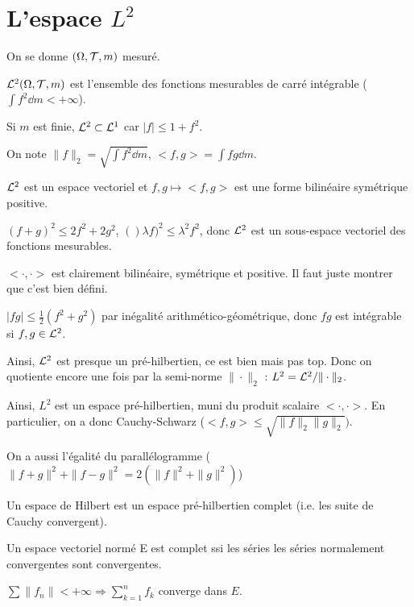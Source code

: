 \documentclass[10pt,a4paper,notitlepage ]{report}
\begin{document}
\section{L'espace $L^2$}

On se donne $(\Omega,\mathcal T, m)$ mesuré.

\begin{definition}
	$\mathcal L^2(\Omega,\mathcal T,m)$ est l'ensemble des fonctions mesurables de carré intégrable ($\int f^2 \dd m < +\infty$).
\end{definition}

\begin{rem}
	Si $m$ est finie, $\mathcal L^2 \subset \mathcal L^1$ car $|f|\le 1+f^2$.
\end{rem}

On note $\|f\|_2 = \sqrt{\int f^2 \dd m}$, $<f,g> = \int fg \dd m$.

\begin{lemme}
	$\mathcal L^2$ est un espace vectoriel et $f,g\mapsto <f,g>$ est une forme bilinéaire symétrique positive.
\end{lemme}
\begin{demo}
	$(f+g)^2 \le 2f^2 + 2g^2$, $()\lambda f)^2 \le \lambda^2 f^2$, donc $\mathcal L^2$ est un sous-espace vectoriel des fonctions mesurables.
	
	$<\cdot, \cdot>$ est clairement bilinéaire, symétrique et positive. Il faut juste montrer que c'est bien défini.
	
	$|fg| \le \frac 1 2 (f^2 + g^2)$ par inégalité arithmético-géométrique, donc $fg$ est intégrable si $f,g\in\mathcal L^2$.
\end{demo}
Ainsi, $\mathcal L^2$ est presque un pré-hilbertien, ce est bien mais pas top. Donc on quotiente encore une fois par la semi-norme $\|\cdot\|_2$ : $L^2 = \mathcal L^2/\|\cdot\|_2$.

Ainsi, $L^2$ est un espace pré-hilbertien, muni du produit scalaire $<\cdot,\cdot>$. En particulier, on a donc Cauchy-Schwarz ($<f,g> \le \sqrt{\|f\|_2\|g\|_2})$.

On a aussi l'égalité du parallélogramme ($\|f+g\|^2 +\|f-g\|^2 = 2(\|f\|^2 + \|g\|^2)$)

\begin{definition}
	Un espace de Hilbert est un espace pré-hilbertien complet (i.e. les suite de Cauchy convergent).
\end{definition}

\begin{propriete}
	Un espace vectoriel normé E est complet ssi les séries les séries normalement convergentes sont convergentes.
	
	$\sum\|f_n\| < +\infty \Rightarrow \sum_{k=1}^n f_k$ converge dans $E$.
\end{propriete}
\end{document}
